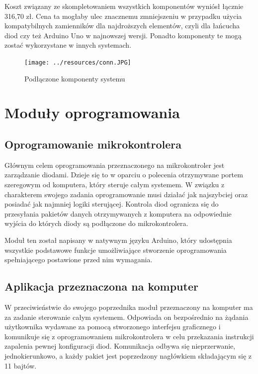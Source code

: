\documentclass[12pt]{report}
\begin{document}
Koszt związany ze skompletowaniem wszystkich komponentów wyniósł łącznie 316,70 zł. Cena ta mogłaby ulec znacznemu zmniejszeniu w przypadku użycia kompatybilnych zamienników dla najdroższych elementów, czyli dla łańcucha diod czy też Arduino Uno w najnowszej wersji. Ponadto komponenty te mogą zostać wykorzystane w innych systemach.

\begin{figure}[h]
\centering
\texttt{[image: ../resources/conn.JPG]}
\caption[Podłączone komponenty systemu]{Podłączone komponenty systemu}
\label{schemat}
\end{figure}

\section{Moduły oprogramowania}

\subsection{Oprogramowanie mikrokontrolera}

Głównym celem oprogramowania przeznaczonego na mikrokontroler jest zarządza\-nie diodami. Dzieje się to w oparciu o polecenia otrzymywane portem szeregowym od komputera, który steruje całym systemem. W związku z charakterem swojego zadania oprogramowanie musi działać jak najszybciej oraz posiadać jak najmniej logiki sterującej. Kontrola diod ogranicza się do przesyłania pakietów danych otrzymywanych z komputera na odpowiednie wyjścia do których diody są podłączone do mikrokontrolera. 

Moduł ten został napisany w natywnym języku Arduino, który udostępnia wszystkie podstawowe funkcje umożliwiające stworzenie oprogramowania spełniającego postawione przed nim wymagania.

\subsection{Aplikacja przeznaczona na komputer}

W przeciwieństwie do swojego poprzednika moduł przeznaczony na komputer ma za zadanie sterowanie całym systemem. Odpowiada on bezpośrednio na żądania użytkownika wydawane za pomocą stworzonego interfejsu graficznego i komunikuje się z oprogramowaniem mikrokontrolera w celu przekazania instrukcji zapalenia pewnej konfiguracji diod. Komunikacja odbywa się nieprzerwanie, jednokierunkowo, a każdy pakiet jest poprzedzony nagłówkiem składającym się z 11 bajtów.
\end{document}
